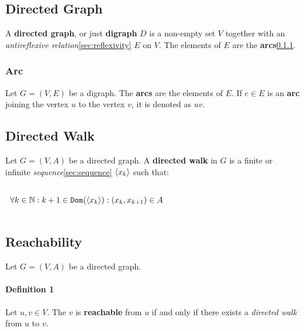 \subsection{Directed Graph}
\label{sec:digraph}

A \textbf{directed graph}, or just \textbf{digraph} $D$ is a non-empty
set $V$ together with an \emph{antireflexive
  relation}\ref{sec:reflexivity} $E$ on $V$. The elements of $E$ are
the \textbf{arcs}\ref{sec:arc}.

\subsubsection{Arc}
\label{sec:arc}

Let $G = (V, E)$ be a digraph. The \textbf{arcs} are the elements of
$E$. If $e \in E$ is an \textbf{arc} joining the vertex $u$ to the
vertex $v$, it is denoted as $uv$.


\subsection{Directed Walk}
\label{sec:directed-walk}

Let $G = (V, A)$ be a directed graph. A \textbf{directed walk} in $G$
is a finite or infinite \textit{sequence}\ref{sec:sequence} $\langle x_k \rangle$
such that:

\begin{math}
  \begin{array}{c}
    \\
    \forall k \in \mathbb{N}: k+1 \in \mathtt{Dom}( \langle x_k \rangle ): (x_k, x_{k+1} ) \in A \\
    \\
  \end{array}
\end{math}


\subsection{Reachability}
\label{sec:reachability}

Let $G = (V, A)$ be a directed graph.

\paragraph{Definition 1}

Let $u, v \in V$. The $v$ is \textbf{reachable} from $u$ if and only
if there exists a \textit{directed walk} from $u$ to $v$.


